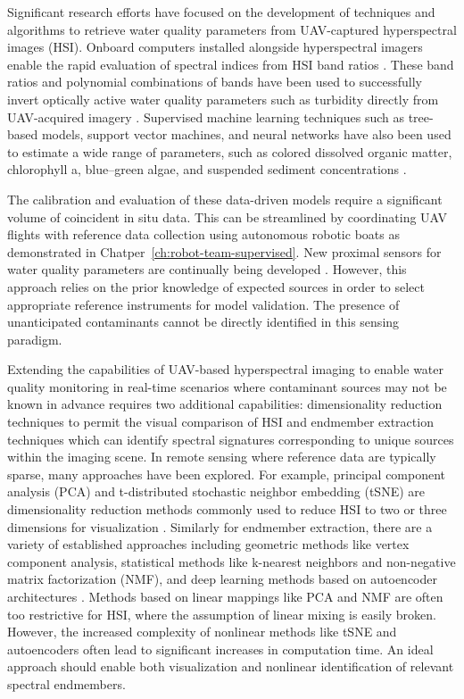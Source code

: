 Significant research efforts have focused on the development of techniques and
algorithms to retrieve water quality parameters from UAV-captured hyperspectral
images (HSI). Onboard computers installed alongside hyperspectral imagers enable
the rapid evaluation of spectral indices from HSI band ratios
\cite{horstrand2019uav}. These band ratios and polynomial combinations of bands
have been used to successfully invert optically active water quality parameters
such as turbidity directly from UAV-acquired imagery \cite{vogt2016near,
  zhang2022selection}. Supervised machine learning techniques such as tree-based
models, support vector machines, and neural networks have also been used to
estimate a wide range of parameters, such as colored dissolved organic matter,
chlorophyll a, blue--green algae, and suspended sediment concentrations
\cite{keller2018hyperspectral, lu2021retrieval}.

The calibration and evaluation of these data-driven models require a significant
volume of coincident in situ data. This can be streamlined by coordinating UAV
flights with reference data collection using autonomous robotic boats as
demonstrated in Chatper~\ref{ch:robot-team-supervised}.
New proximal sensors for water quality parameters are continually being
developed \cite{proximal-sensing-1, proximal-sensing-2}. However, this approach
relies on the prior knowledge of expected sources in order to select appropriate
reference instruments for model validation. The presence of unanticipated
contaminants cannot be directly identified in this sensing paradigm.

Extending the capabilities of UAV-based hyperspectral imaging to enable water
quality monitoring in real-time scenarios where contaminant sources may not be
known in advance requires two additional capabilities: dimensionality reduction
techniques to permit the visual comparison of HSI and endmember extraction
techniques which can identify spectral signatures corresponding to unique
sources within the imaging scene. In remote sensing where reference data are
typically sparse, many approaches have been explored. For example, principal
component analysis (PCA) and t-distributed stochastic neighbor embedding (tSNE)
are dimensionality reduction methods commonly used to reduce HSI to two or three
dimensions for visualization \cite{tyo2003principal,zhang2015hyperspectral}.
Similarly for endmember extraction, there are a variety of established
approaches including geometric methods like vertex component analysis,
statistical methods like k-nearest neighbors and non-negative matrix
factorization (NMF), and deep learning methods based on autoencoder
architectures \cite{heylen2014review,vca-orig, unmixing-nmf-review-2,
  cariou2015unsupervised, su2019daen, borsoi2019deep, palsson2020convolutional}.
Methods based on linear mappings like PCA and NMF are often too restrictive for
HSI, where the assumption of linear mixing is easily broken. However, the
increased complexity of nonlinear methods like tSNE and autoencoders often lead
to significant increases in computation time. An ideal approach should enable
both visualization and nonlinear identification of relevant spectral endmembers.

